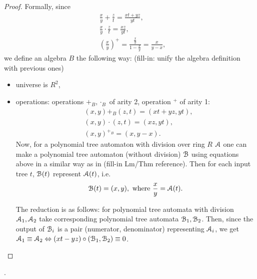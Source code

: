 \begin{proof}
  		Formally, since
  		\begin{align*}
  			&\frac{x}{y} + \frac{z}{t} = \frac{xt+yz}{yt},\\ 
  			&\frac{x}{y} \cdot \frac{z}{t} = \frac{xz}{yt},\\
  			&\left(\frac{x}{y}\right)^+ = \frac{\frac{x}{y}}{1-\frac{x}{y}} = \frac{x}{y-x},
  		\end{align*}
  		we define an algebra $B$ the following way: (fill-in: unify the algebra definition with previous ones)
  		\begin{itemize}
  			\item universe is $R^2$,
  			\item operations: operations $+_B, \cdot_B$ of arity 2, operation $^+$ of arity 1:
  			\begin{align*}
  				&(x,y) +_B (z,t) = (xt+yz, yt),\\
  				&(x,y)\cdot(z,t) = (xz, yt),\\
  				&(x,y)^{+_B} = (x, y-x).
  			\end{align*}
  		Now, for a polynomial tree automaton with division over ring $R$ ${\mathcal A}$ one can make a polynomial tree automaton (without division) ${\mathcal B}$ using equations above in a similar way as in (fill-in Lm/Thm reference). Then for each input tree $t$, ${\mathcal B}(t)$ represent ${\mathcal A}(t)$, i.e.
  		$$
  			{\mathcal B}(t) = (x,y), \text{ where } \frac{x}{y} = {\mathcal A}(t).
  		$$
  		
  		The reduction is as follows: for polynomial tree automata with division ${\mathcal A}_1, {\mathcal A}_2$ take corresponding polynomial tree automata ${\mathcal B}_1, {\mathcal B}_2$. Then, since the output of ${\mathcal B}_i$ is a pair (numerator, denominator) representing ${\mathcal A}_i$, we get ${\mathcal A}_1 \equiv {\mathcal A}_2 \Leftrightarrow (xt-yz)\circ({\mathcal B}_1, {\mathcal B}_2) \equiv 0$.
  		\end{itemize}


  		
\end{proof}
.
